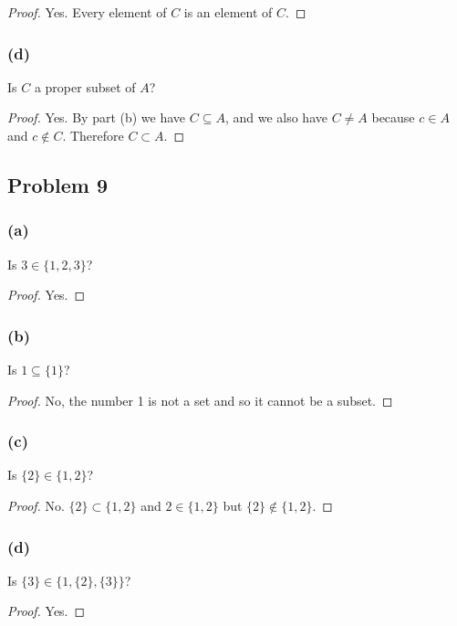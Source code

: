 \documentclass[14pt]{extarticle}
\begin{document}
\begin{proof}
    Yes. Every element of $C$ is an element of $C$.
\end{proof}

\subsubsection{(d)}
Is $C$ a proper subset of $A$?

\begin{proof}
    Yes. By part (b) we have $C \subseteq A$, and we also have $C \neq A$ because
    $c \in A$ and $c \notin C$. Therefore $C \subset A$.
\end{proof}

\subsection{Problem 9}
\subsubsection{(a)}
Is $3 \in \{1, 2, 3\}$?

\begin{proof}
    Yes.
\end{proof}

\subsubsection{(b)}
Is $1 \subseteq \{1\}$?

\begin{proof}
    No, the number 1 is not a set and so it cannot be a subset.
\end{proof}

\subsubsection{(c)}
Is $\{2\} \in \{1, 2\}$?

\begin{proof}
    No. $\{2\} \subset \{1, 2\}$ and $2 \in \{1, 2\}$ but $\{2\} \notin \{1, 2\}$.
\end{proof}

\subsubsection{(d)}
Is $\{3\} \in \{1, \{2\}, \{3\}\}$?

\begin{proof}
    Yes.
\end{proof}
\end{document}
